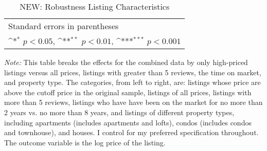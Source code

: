\begin{landscape}
	\begin{table}[htbp]\centering
		\def\sym#1{\ifmmode^{#1}\else\(^{#1}\)\fi}
		\caption{NEW: Robustness Listing Characteristics}
		\begin{tabular}{l*{8}{c}}
			\hline\hline
			
			\hline\hline
			\multicolumn{9}{l}{\footnotesize Standard errors in parentheses}\\
			\multicolumn{9}{l}{\footnotesize \sym{*} \(p<0.05\), \sym{**} \(p<0.01\), \sym{***} \(p<0.001\)}\\
		\end{tabular}
		\label{table:robustlisting}
		\begin{tablenotes}
			\item {\it Note:} This table breaks the effects for the combined data by only high-priced listings versus all prices, listings with greater than 5 reviews, the time on market, and property type. The categories, from left to right, are: listings whose price are above the cutoff price in the original sample, listings of all prices, listings with more than 5 reviews, listings who have have been on the market for no more than 2 years vs. no more than 8 years, and listings of different property types, including apartments (includes apartments and lofts), condos (includes condos and townhouse), and houses. I control for my preferred specification throughout. The outcome variable is the log price of the listing.
		\end{tablenotes}
	\end{table}
\end{landscape}



